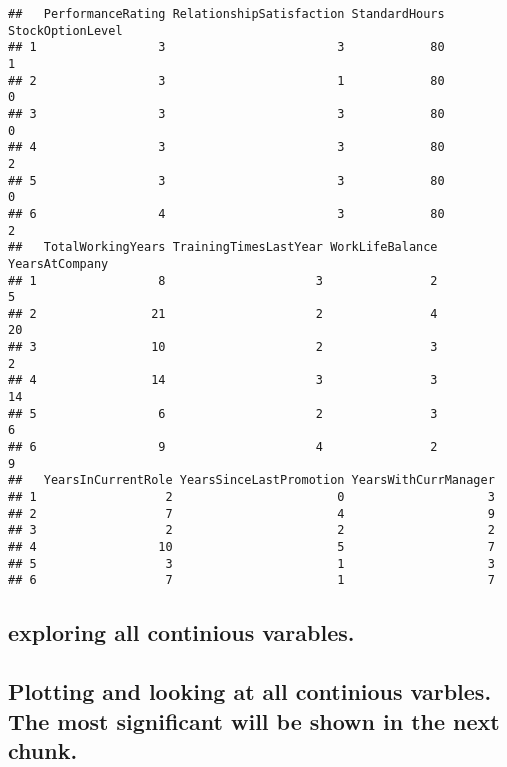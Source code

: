 \documentclass[
]{article}
\begin{document}
\begin{verbatim}
##   PerformanceRating RelationshipSatisfaction StandardHours StockOptionLevel
## 1                 3                        3            80                1
## 2                 3                        1            80                0
## 3                 3                        3            80                0
## 4                 3                        3            80                2
## 5                 3                        3            80                0
## 6                 4                        3            80                2
##   TotalWorkingYears TrainingTimesLastYear WorkLifeBalance YearsAtCompany
## 1                 8                     3               2              5
## 2                21                     2               4             20
## 3                10                     2               3              2
## 4                14                     3               3             14
## 5                 6                     2               3              6
## 6                 9                     4               2              9
##   YearsInCurrentRole YearsSinceLastPromotion YearsWithCurrManager
## 1                  2                       0                    3
## 2                  7                       4                    9
## 3                  2                       2                    2
## 4                 10                       5                    7
## 5                  3                       1                    3
## 6                  7                       1                    7
\end{verbatim}

\hypertarget{exploring-all-continious-varables.}{%
\subsection{exploring all continious
varables.}\label{exploring-all-continious-varables.}}

\hypertarget{plotting-and-looking-at-all-continious-varbles.-the-most-significant-will-be-shown-in-the-next-chunk.}{%
\subsection{Plotting and looking at all continious varbles. The most
significant will be shown in the next
chunk.}\label{plotting-and-looking-at-all-continious-varbles.-the-most-significant-will-be-shown-in-the-next-chunk.}}
\end{document}
